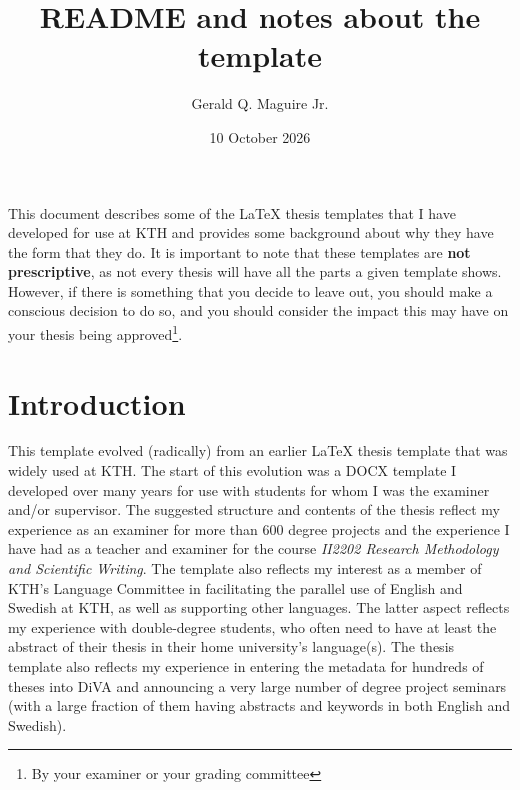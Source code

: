 \documentclass[12pt, twoside]{article}
\title{README and notes about the template}
\author{Gerald Q. Maguire Jr.}
\date{10 October 2026}
\begin{document}
\glsresetall[]
\maketitle
{}

This document describes some of the \LaTeX{} thesis templates that I have developed for use at \gls{KTH} and provides some background about why they have the form that they do. It is important to note that these templates are \textbf{not prescriptive}, as not every thesis will have all the parts a given template shows. However, if there is something that you decide to leave out, you should make a conscious decision to do so, and you should consider the impact this may have on your thesis being approved\footnote{By your examiner or your grading committee}.

\cleardoublepage
\renewcommand{\sectionmark}[1]{ \markboth{#1}{}}
\tableofcontents
\markboth{\contentsname}{}
\cleardoublepage
\setcounter{page}{1}
\glsresetall
\section{Introduction}
This template evolved (radically) from an earlier \LaTeX{} thesis template that was widely used at \gls{KTH}. The start of this evolution was a DOCX template I developed over many years for use with students for whom I was the examiner and/or supervisor. The suggested structure and contents of the thesis reflect my experience as an examiner for more than 600 degree projects and the experience I have had as a teacher and examiner for the course \textit{II2202 Research Methodology and Scientific Writing}. The template also reflects my interest as a member of KTH's Language Committee in facilitating the parallel use of English and Swedish at \gls{KTH}, as well as supporting other languages. The latter aspect
reflects my experience with double-degree students, who often need to have at least the abstract of their thesis in their home university's language(s). The thesis template also reflects my experience in entering the metadata for hundreds of theses into \gls{DiVA} and announcing a very large number of degree project seminars (with a large fraction of them having abstracts and keywords in both English and Swedish).
\end{document}
